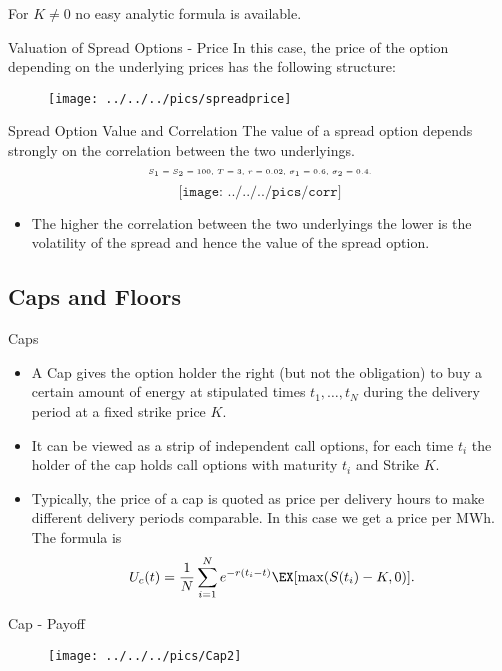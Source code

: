 For $K\neq 0$ no easy analytic formula is available.




{Valuation of Spread Options - Price}
In this case, the price of the option depending on the underlying prices has the following structure:
\begin{figure}
	\centering
		\texttt{[image: ../../../pics/spreadprice]}
	\label{fig:spreadprice}
\end{figure}



{Spread Option Value and Correlation}
The value of a spread option depends strongly on the correlation between the two underlyings.
$$\tiny\text{$S_1=S_2=100$, $T=3$, $r=0.02$, $\sigma_1=0.6$, $\sigma_2=0.4$.}$$
\vspace{-0.76cm}
$$\texttt{[image: ../../../pics/corr]}$$
\begin{itemize}
\vspace{-1cm}
\item The higher the correlation between the two underlyings the lower is the volatility of the spread and hence the value of the spread option.
\end{itemize}




\subsection{Caps and  Floors}

{Caps}
\begin{itemize}
\item<1->
A Cap gives the option holder the right (but not the
obligation) to buy a certain amount of energy at stipulated times
$t_1,\ldots,t_N$ during the delivery period at a fixed strike
price $K$.
\item<2->
It can be viewed as a strip of
independent call options, for each time $t_i$ the holder of the cap holds call options with maturity $t_i$ and Strike $K$.
\item<3->
Typically, the price of a cap is quoted as price per delivery hours to make
different delivery periods comparable. In this case we get a price
per MWh. The formula is
$$U_c(t)=\frac{1}{N}\sum_{i=1}^Ne^{-r(t_i-t)}\EX[\max(S(t_i)-K,0)].$$
\end{itemize}



{Cap - Payoff}
\begin{figure}
	\centering
		\texttt{[image: ../../../pics/Cap2]}
	\label{fig:Cap2}
\end{figure}




